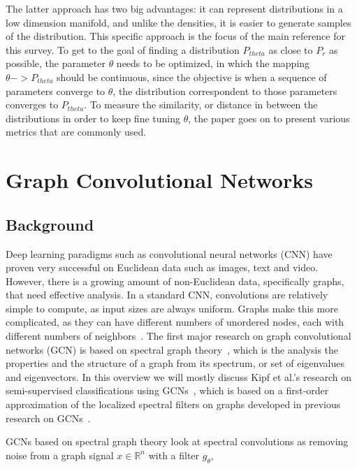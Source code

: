 \documentclass{article}
\begin{document}
The latter approach has two big advantages: it can represent distributions in a low dimension manifold, and unlike the densities, it is easier to generate samples of the distribution. This specific approach is the focus of the main reference for this survey. To get to the goal of finding a distribution  $P_{theta}$ as close to $P_{r}$ as possible, the parameter $\theta$ needs to be optimized, in which the mapping $\theta -> P_{theta}$ should be continuous, since the objective is when a sequence of parameters converge to $\theta$, the distribution correspondent to those parameters converges to $P_{theta}$. To measure the similarity, or distance in between the distributions in order to keep fine tuning $\theta$, the paper goes on to present various metrics that are commonly used. 



\section{Graph Convolutional Networks}
\subsection{Background}
Deep learning paradigms such as convolutional neural networks (CNN) have proven very successful on Euclidean data such as images, text and video.  However, there is a growing amount of non-Euclidean data, specifically graphs, that need effective analysis. In a standard CNN, convolutions are relatively simple to compute, as input sizes are always uniform. Graphs make this more complicated, as they can have different numbers of unordered nodes, each with different numbers of neighbors~\cite{Wu2019}. The first major research on graph convolutional networks (GCN) is based on spectral graph theory~\cite{Bruna2013}, which is the analysis the properties and the structure of a graph from its spectrum, or set of eigenvalues and eigenvectors. In this overview we will mostly discuss Kipf et al.'s research on semi-supervised classifications using GCNs~\cite{Kipf2016}, which is based on a first-order approximation of the localized spectral filters on graphs developed in previous research on GCNs~\cite{Bruna2013}. 

GCNs based on spectral graph theory look at spectral convolutions as removing noise from a graph signal $x \in \mathbb{R}^n$ with a filter $g_\theta$,
\setcounter{equation}{0}
\end{document}
